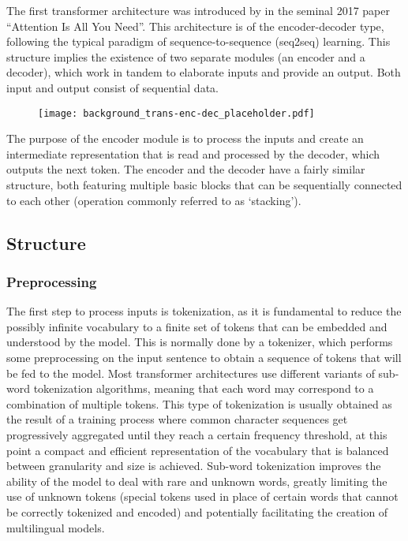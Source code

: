The first transformer architecture was introduced by \citet{vaswani2017} in the seminal 2017 paper ``Attention Is All You Need''.
This architecture is of the encoder-decoder type, following the typical paradigm of sequence-to-sequence (seq2seq) learning.
This structure implies the existence of two separate modules (an encoder and a decoder), which work in tandem to elaborate inputs and provide an output.
Both input and output consist of sequential data.

\begin{figure}[H]
    \centering
    \texttt{[image: background\_trans-enc-dec\_placeholder.pdf]}
    \caption{}
    \label{fig:background_trans-enc-dec}
\end{figure}

The purpose of the encoder module is to process the inputs and create an intermediate representation that is read and processed by the decoder, which outputs the next token.
The encoder and the decoder have a fairly similar structure, both featuring multiple basic blocks that can be sequentially connected to each other (operation commonly referred to as `stacking').

\subsection{Structure}

\subsubsection*{Preprocessing}

The first step to process inputs is tokenization, as it is fundamental to reduce the possibly infinite vocabulary to a finite set of tokens that can be embedded and understood by the model.
This is normally done by a tokenizer, which performs some preprocessing on the input sentence to obtain a sequence of tokens that will be fed to the model.
Most transformer architectures use different variants of sub-word tokenization algorithms, meaning that each word may correspond to a combination of multiple tokens.
This type of tokenization is usually obtained as the result of a training process where common character sequences get progressively aggregated until they reach a certain frequency threshold, at this point a compact and efficient representation of the vocabulary that is balanced between granularity and size is achieved.
Sub-word tokenization improves the ability of the model to deal with rare and unknown words, greatly limiting the use of unknown tokens (special tokens used in place of certain words that cannot be correctly tokenized and encoded) and potentially facilitating the creation of multilingual models.

